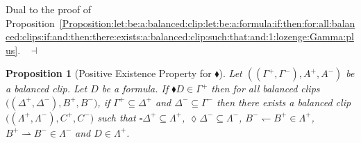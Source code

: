 \documentclass[draft]{article}
\newtheorem{proposition}{Proposition}
\newenvironment{proof}{{\bf Proof:}}{~$\dashv$\\}
\begin{document}
%
%
\begin{proof}
%
%
Dual to the proof of Proposition~\ref{Proposition:let:be:a:balanced:clip:let:be:a:formula:if:then:for:all:balanced:clips:if:and:then:there:exists:a:balanced:clip:such:that:and:1:lozenge:Gamma:plus}.
%
%
\medskip
%
%
\end{proof}
%
%
\begin{proposition}[Positive Existence Property for $\blacklozenge$]\label{Proposition:let:be:a:balanced:clip:let:be:a:formula:if:then:for:all:balanced:clips:if:and:then:there:exists:a:balanced:clip:such:that:and:1}
%
%
Let $((\Gamma^{+},\Gamma^{-}),A^{+},A^{-})$ be a
%
%
%
%
%
%
%
\linebreak
%
%
%
%
%
%
balanced clip.
Let $D$ be a formula.
If ${\blacklozenge}D{\in}\Gamma^{+}$ then for all balanced clips $((\Delta^{+},\Delta^{-}),
%
%
%
%
%
%
%
$\linebreak$
%
%
%
%
%
%
B^{+},B^{-})$, if $\Gamma^{+}{\subseteq}\Delta^{+}$ and $\Delta^{-}{\subseteq}\Gamma^{-}$ then there exists a balanced clip $((\Lambda^{+},\Lambda^{-}),C^{+},
%
%
%
%
%
%
%
$\linebreak$
%
%
%
%
%
%
C^{-})$ such that ${\square}\Delta^{+}{\subseteq}\Lambda^{+}$, ${\lozenge}\Delta^{-}{\subseteq}\Lambda^{-}$, $B^{-}{\leftharpoondown}B^{+}{\in}\Lambda^{+}$, $B^{+}{\rightharpoonup}B^{-}{\in}\Lambda^{-}$ and $D{\in}\Lambda^{+}$.
%
%
\end{proposition}
%
%
\end{document}
